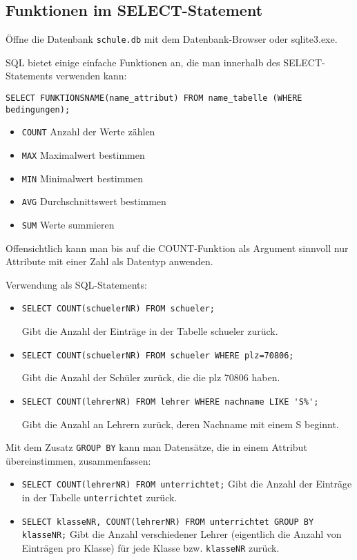 \subsection[Funktionen]{Funktionen im SELECT-Statement}\label{funktionen}
Öffne die Datenbank \texttt{schule.db} mit dem Datenbank-Browser oder sqlite3.exe.

SQL bietet einige einfache Funktionen an, die man innerhalb des SELECT-Statements verwenden kann:
\begin{tcolorbox}[title=Funktionen in SQL]
	\lstinline!SELECT FUNKTIONSNAME(name_attribut) FROM name_tabelle (WHERE bedingungen);!
\end{tcolorbox}
\begin{itemize}
	\item \lstinline!COUNT!	Anzahl der Werte zählen
	\item \lstinline!MAX!	Maximalwert bestimmen
	\item \lstinline!MIN!	Minimalwert bestimmen
	\item \lstinline!AVG!	Durchschnittswert bestimmen
	\item \lstinline!SUM!	Werte summieren
\end{itemize}

Offensichtlich kann man bis auf die COUNT-Funktion als Argument sinnvoll nur Attribute mit einer Zahl als Datentyp anwenden.

Verwendung als SQL-Statements:
\begin{itemize}
	\item \lstinline!SELECT COUNT(schuelerNR) FROM schueler;!

	Gibt die Anzahl der Einträge in der Tabelle schueler zurück.
	\item \lstinline!SELECT COUNT(schuelerNR) FROM schueler WHERE plz=70806;!

	Gibt die Anzahl der Schüler zurück, die die plz 70806 haben.
	\item \lstinline!SELECT COUNT(lehrerNR) FROM lehrer WHERE nachname LIKE 'S%';!

	Gibt die Anzahl an Lehrern zurück, deren Nachname mit einem S beginnt.
\end{itemize}
Mit dem Zusatz \lstinline!GROUP BY! kann man Datensätze, die in einem Attribut übereinstimmen, zusammenfassen:
\begin{itemize}
	\item \lstinline!SELECT COUNT(lehrerNR) FROM unterrichtet;!
	Gibt die Anzahl der Einträge in der Tabelle \lstinline!unterrichtet! zurück.
	\item \lstinline!SELECT klasseNR, COUNT(lehrerNR) FROM unterrichtet GROUP BY klasseNR;!
	Gibt die Anzahl verschiedener Lehrer (eigentlich die Anzahl von Einträgen pro Klasse) für jede Klasse bzw. \lstinline!klasseNR! zurück.
\end{itemize}

